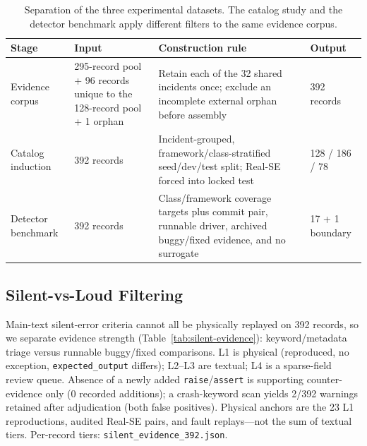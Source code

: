 \documentclass[sigconf,nonacm]{acmart}
\begin{document}
\begin{table}[H]
\centering
\small
\caption{Separation of the three experimental datasets. The catalog study and
the detector benchmark apply different filters to the same evidence corpus.}
\label{tab:dataset-construction-flow}
\begin{tabularx}{\linewidth}{@{}l l X l@{}}
\toprule
\textbf{Stage} & \textbf{Input} & \textbf{Construction rule} & \textbf{Output} \\
\midrule
Evidence corpus &
295-record pool + 96 records unique to the 128-record pool + 1 orphan &
Retain each of the 32 shared incidents once; exclude an incomplete external
orphan before assembly &
392 records \\
Catalog induction &
392 records &
Incident-grouped, framework/class-stratified seed/dev/test split; Real-SE
forced into locked test &
128 / 186 / 78 \\
Detector benchmark &
392 records &
Class/framework coverage targets plus commit pair, runnable driver, archived
buggy/fixed evidence, and no surrogate &
17 + 1 boundary \\
\bottomrule
\end{tabularx}
\end{table}

\subsection{Silent-vs-Loud Filtering}
\label{app:method-silent}

Main-text silent-error criteria cannot all be physically replayed on 392
records, so we separate evidence strength (Table~\ref{tab:silent-evidence}):
keyword/metadata triage versus runnable buggy/fixed comparisons. L1 is
physical (reproduced, no exception, \texttt{expected\_output} differs); L2--L3
are textual; L4 is a sparse-field review queue. Absence of a newly added
\texttt{raise}/\texttt{assert} is supporting counter-evidence only (0 recorded
additions); a crash-keyword scan yields 2/392 warnings retained after
adjudication (both false positives). Physical anchors are the 23 L1
reproductions, audited Real-SE pairs, and fault replays---not the sum of
textual tiers. Per-record tiers:
\texttt{silent\_evidence\_392.json}.
\end{document}
